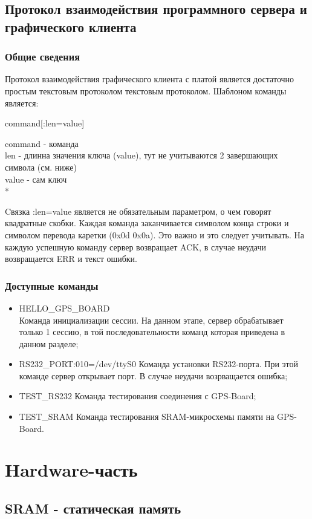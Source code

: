 \subsection{Протокол взаимодействия программного сервера и графического клиента}
\subsubsection{Общие сведения}
Протокол взаимодействия графического клиента с платой является достаточно простым текстовым протоколом текстовым протоколом. Шаблоном
команды является:
\begin{center}
command[:len=value]
\end{center}
command - команда \\
len - длинна значения ключа (value), тут не учитываются 2 завершающих символа (см. ниже)\\
value - сам ключ \\*

Cвязка :len=value является не обязательным параметром, о чем говорят квадратные скобки. Каждая команда заканчивается символом конца строки
и символом перевода каретки (0x0d 0x0a). Это важно и это следует учитывать. На каждую успешную команду сервер возвращает ACK, в случае
неудачи возвращается ERR и текст ошибки.

\subsubsection{Доступные команды}
\begin{itemize}
\item HELLO\_GPS\_BOARD \\
Команда инициализации сессии. На данном этапе, сервер обрабатывает только 1 сессию, в той последовательности команд которая приведена в 
данном разделе;
\item RS232\_PORT:010=/dev/ttyS0
Команда установки RS232-порта. При этой команде сервер открывает порт. В случае неудачи возрващается ошибка;
\item TEST\_RS232
Команда тестирования соединения с GPS-Board;
\item TEST\_SRAM
Команда тестирования SRAM-микросхемы памяти на GPS-Board.
\end{itemize}

\section{Hardware-часть}

\subsection{SRAM - статическая память}
